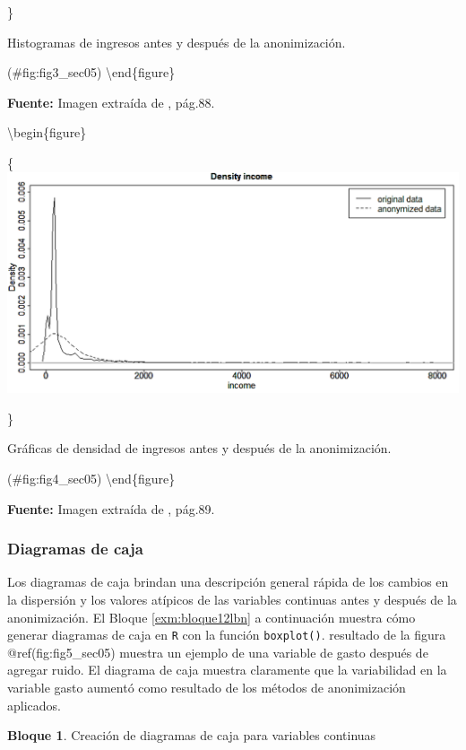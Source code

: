 \documentclass[]{book}
\theoremstyle{definition}
\theoremstyle{definition}
\newtheorem{example}{Bloque}[chapter]
\theoremstyle{definition}
\theoremstyle{definition}
\theoremstyle{remark}
\begin{document}
\}

\caption{Histogramas de ingresos antes y después de la anonimización.}

(\#fig:fig3\_sec05)
\textbackslash{}end\{figure\}

\textbf{Fuente:} Imagen extraída de \citep{benschop2021}, pág.88.

\textbackslash{}begin\{figure\}

\{\centering \includegraphics[width=0.9\linewidth]{Imagenes/fig4}

\}

\caption{Gráficas de densidad de ingresos antes y después de la anonimización.}

(\#fig:fig4\_sec05)
\textbackslash{}end\{figure\}

\textbf{Fuente:} Imagen extraída de \citep{benschop2021}, pág.89.

\hypertarget{diagramas-de-caja}{%
\subsubsection{Diagramas de caja}\label{diagramas-de-caja}}

Los diagramas de caja brindan una descripción general rápida de los cambios en la dispersión y los valores atípicos de las variables continuas antes y después de la anonimización. El Bloque \ref{exm:bloque12lbn} a continuación muestra cómo generar diagramas de caja en \texttt{R} con la función \texttt{boxplot()}. resultado de la figura
@ref(fig:fig5\_sec05) muestra un ejemplo de una variable de gasto después de agregar ruido. El diagrama de caja muestra claramente que la variabilidad en la variable gasto aumentó como resultado de los métodos de anonimización aplicados.

\begin{example}
\protect\hypertarget{exm:bloque12lbn}{}{\label{exm:bloque12lbn} }Creación de diagramas de caja para variables continuas
\end{example}
\end{document}
